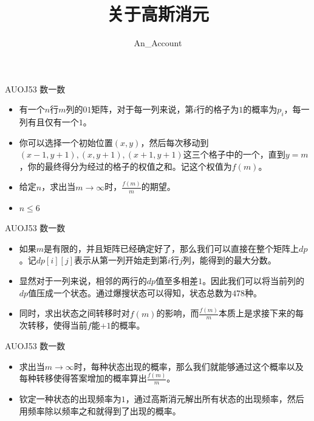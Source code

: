 \documentclass{beamer}
\begin{document}
\begin{frame}
    \title{关于高斯消元}
    \author{An\_Account}
    \begin{titlepage}
    \end{titlepage}
\end{frame}

\begin{frame}{AUOJ53 数一数}
    \begin{itemize}
        \item 有一个$n$行$m$列的$01$矩阵，对于每一列来说，第$i$行的格子为$1$的概率为$p_i$，每一列有且仅有一个$1$。
        \item 你可以选择一个初始位置$(x,y)$，然后每次移动到$(x-1,y+1),(x,y+1),(x+1,y+1)$这三个格子中的一个，直到$y = m$，你的最终得分为经过的格子的权值之和。记这个权值为$f(m)$。
        \item 给定$n$，求出当$m\rightarrow\infty$时，$\frac{f(m)}{m}$的期望。
        \item $n\leq 6$
    \end{itemize}
\end{frame}

\begin{frame}{AUOJ53 数一数}
    \begin{itemize}
        \item 如果$m$是有限的，并且矩阵已经确定好了，那么我们可以直接在整个矩阵上$dp$。记$dp[i][j]$表示从第一列开始走到第$i$行$j$列，能得到的最大分数。
        \item 显然对于一列来说，相邻的两行的$dp$值至多相差$1$。因此我们可以将当前列的$dp$值压成一个状态。通过爆搜状态可以得知，状态总数为$478$种。
        \item 同时，求出状态之间转移时对$f(m)$的影响，而$\frac{f(m)}{m}$本质上是求接下来的每次转移，使得当前$f$能$+1$的概率。
    \end{itemize}
\end{frame}

\begin{frame}{AUOJ53 数一数}
    \begin{itemize}
        \item 求出当$m\rightarrow\infty$时，每种状态出现的概率，那么我们就能够通过这个概率以及每种转移使得答案增加的概率算出$\frac{f(m)}{m}$。
        \item 钦定一种状态的出现频率为$1$，通过高斯消元解出所有状态的出现频率，然后用频率除以频率之和就得到了出现的概率。
    \end{itemize}
\end{frame}
\end{document}
